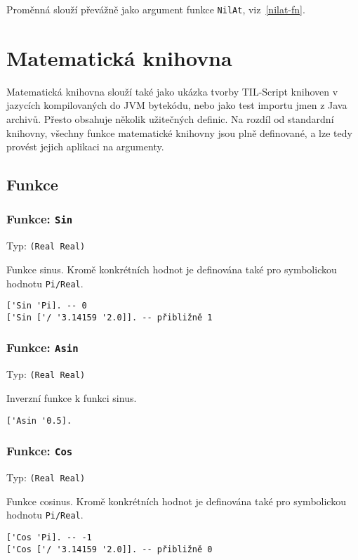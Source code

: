 Proměnná slouží převážně jako argument funkce \lstinline{NilAt}, viz~\ref{nilat-fn}.

\section{Matematická knihovna}

Matematická knihovna slouží také jako ukázka tvorby TIL-Script knihoven v jazycích kompilovaných
do JVM bytekódu, nebo jako test importu jmen z Java archivů. Přesto obsahuje několik užitečných
definic. Na rozdíl od standardní knihovny, všechny funkce matematické knihovny jsou plně
definované, a lze tedy provést jejich aplikaci na argumenty.

\subsection{Funkce}

\subsubsection*{Funkce: \lstinline{Sin}}
Typ: \lstinline{(Real Real)}

Funkce sinus. Kromě konkrétních hodnot je definována také pro symbolickou hodnotu
\lstinline{Pi/Real}.

\begin{lstlisting}[caption={Ukázka využití Sin}]
['Sin 'Pi]. -- 0
['Sin ['/ '3.14159 '2.0]]. -- přibližně 1
\end{lstlisting}

\subsubsection*{Funkce: \lstinline{Asin}}
Typ: \lstinline{(Real Real)}

Inverzní funkce k funkci sinus.

\begin{lstlisting}[caption={Ukázka využití Asin}]
['Asin '0.5].
\end{lstlisting}

\subsubsection*{Funkce: \lstinline{Cos}}
Typ: \lstinline{(Real Real)}

Funkce cosinus. Kromě konkrétních hodnot je definována také pro symbolickou hodnotu
\lstinline{Pi/Real}.

\begin{lstlisting}[caption={Ukázka využití Cos}]
['Cos 'Pi]. -- -1
['Cos ['/ '3.14159 '2.0]]. -- přibližně 0
\end{lstlisting}

